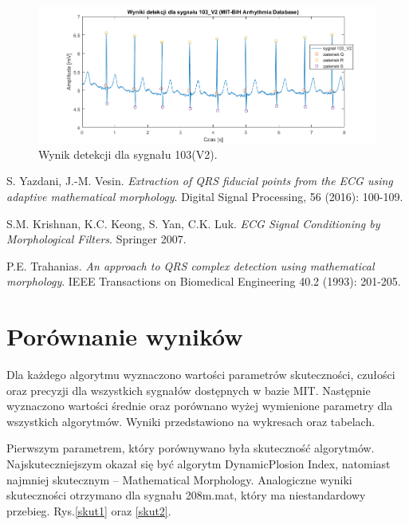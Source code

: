 \documentclass[10pt,a4paper]{article}
\begin{document}
\begin{figure}[h]
	\centerline{\includegraphics[scale=0.85]{103_V2}}
	\caption{Wynik detekcji dla sygnału 103(V2).}
	\label{103V2}
\end{figure}

\FloatBarrier
\newpage

\begin{thebibliography}{9}
 
S. Yazdani, J.-M. Vesin. 
\textit{Extraction of QRS fiducial points from the ECG using adaptive mathematical morphology}. 
Digital Signal Processing, 56 (2016): 100-109.

S.M. Krishnan, K.C. Keong, S. Yan, C.K. Luk.
\textit{ECG Signal Conditioning by Morphological Filters}. 
Springer 2007.
 
P.E. Trahanias. 
\textit{An approach to QRS complex detection using mathematical morphology}. IEEE Transactions on Biomedical Engineering 40.2 (1993): 201-205.

\end{thebibliography}

\newpage
\section{Porównanie wyników}

\bigskip
\bigskip

Dla każdego algorytmu wyznaczono wartości parametrów skuteczności, czułości oraz precyzji dla wszystkich sygnałów dostępnych w bazie MIT. Następnie wyznaczono wartości średnie oraz porównano wyżej wymienione parametry dla wszystkich algorytmów. Wyniki przedstawiono na wykresach oraz tabelach. 


Pierwszym parametrem, który porównywano była skuteczność algorytmów. Najskuteczniejszym okazał się być algorytm DynamicPlosion Index, natomiast najmniej skutecznym – Mathematical Morphology. Analogiczne wyniki skuteczności otrzymano dla sygnału 208m.mat, który ma niestandardowy przebieg. Rys.\ref{skut1} oraz \ref{skut2}.
\end{document}
